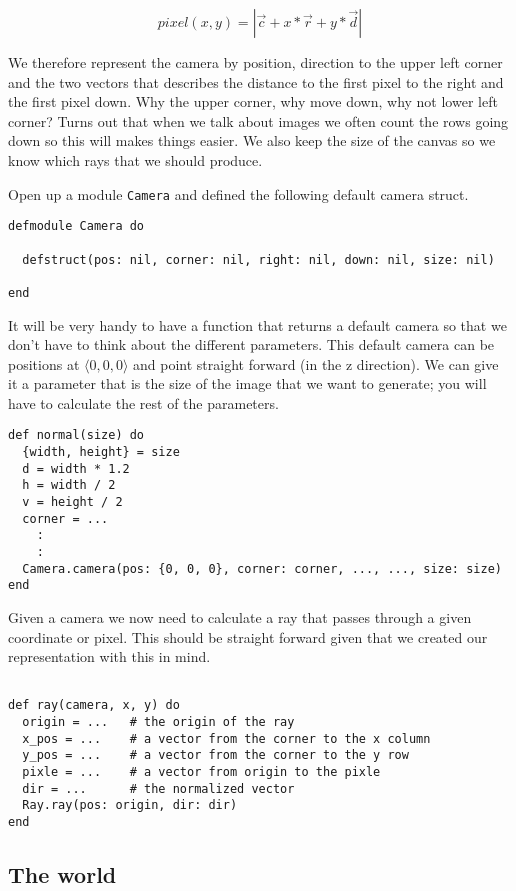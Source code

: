 \documentclass[a4paper,11pt]{article}
\begin{document}
$$pixel(x,y) = |\vec{c} + x*\vec{r} + y*\vec{d}|$$

We therefore represent the camera by position, direction to the upper
left corner and the two vectors that describes the distance to the
first pixel to the right and the first pixel down. Why the upper
corner, why move down, why not lower left corner? Turns out that when
we talk about images we often count the rows going down so this will
makes things easier. We also keep the size of the canvas so we know
which rays that we should produce.

Open up a module {\tt Camera} and defined the following default camera struct. 

\begin{verbatim}
defmodule Camera do

  defstruct(pos: nil, corner: nil, right: nil, down: nil, size: nil)
  
end
\end{verbatim}

It will be very handy to have a function that returns a default
camera so that we don't have to think about the different
parameters. This default camera can be positions at
$\langle 0,0,0\rangle$ and point straight forward (in the z
direction). We can give it a parameter that is the size of the image
that we want to generate; you will have to calculate the rest of the
parameters.

\begin{verbatim}
def normal(size) do
  {width, height} = size
  d = width * 1.2
  h = width / 2
  v = height / 2
  corner = ...
    :
    :
  Camera.camera(pos: {0, 0, 0}, corner: corner, ..., ..., size: size)
end
\end{verbatim}

Given a camera we now need to calculate a ray that passes through a
given coordinate or pixel. This should be straight forward given that
we created our representation with this in mind.

\begin{verbatim}

def ray(camera, x, y) do
  origin = ...   # the origin of the ray
  x_pos = ...    # a vector from the corner to the x column
  y_pos = ...    # a vector from the corner to the y row
  pixle = ...    # a vector from origin to the pixle
  dir = ...      # the normalized vector
  Ray.ray(pos: origin, dir: dir)
end
\end{verbatim}


\subsection*{The world}
\end{document}
